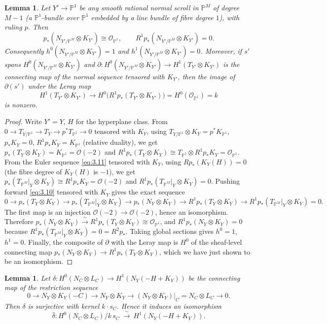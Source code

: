 \documentclass[11pt,twoside]{amsart}
\theoremstyle{plain}
\newtheorem{lemma}[theorem]{Lemma}
\theoremstyle{definition}
\newcommand{\PP}{\mathbb{P}}
\newcommand{\PM}{\mathbb{P}^M}
\newcommand{\OO}{\mathcal{O}}
\newcommand{\NY}{N_{Y}}
\newcommand{\TP}{T_{\PM}|_Y}
\begin{document}
\begin{lemma}\label{lem:pushforward}
Let $Y'\to\PP^1$ be any smooth rational normal scroll in $\PM$ of degree $M-1$ (a $\PP^1$-bundle over $\PP^1$ embedded by a line bundle of fibre degree $1$), with ruling $p$. Then
\[
p_*(N_{Y'/\PM}\otimes K_{Y'})\cong\OO_{\PP^1},\qquad R^1p_*(N_{Y'/\PM}\otimes K_{Y'})=0 .
\]
Consequently $h^0(N_{Y'/\PM}\otimes K_{Y'})=1$ and $h^1(N_{Y'/\PM}\otimes K_{Y'})=0$. Moreover, if $s'$ spans $H^0(N_{Y'/\PM}\otimes K_{Y'})$ and $\partial\colon H^0(N_{Y'/\PM}\otimes K_{Y'})\to H^1(T_{Y'}\otimes K_{Y'})$ is the connecting map of the normal sequence tensored with $K_{Y'}$, then the image of $\partial(s')$ under the Leray map
\[
H^1(T_{Y'}\otimes K_{Y'})\longrightarrow H^0\big(R^1p_*(T_{Y'}\otimes K_{Y'})\big)=H^0(\OO_{\PP^1})=k
\]
is nonzero.
\end{lemma}

\begin{proof}
Write $Y'=Y$, $H$ for the hyperplane class. From $0\to T_{Y/\PP^1}\to T_Y\to p^*T_{\PP^1}\to 0$ tensored with $K_Y$, using $T_{Y/\PP^1}\otimes K_Y=p^*K_{\PP^1}$, $p_*K_Y=0$, $R^1p_*K_Y=K_{\PP^1}$ (relative duality), we get $p_*(T_Y\otimes K_Y)=K_{\PP^1}=\OO(-2)$ and $R^1p_*(T_Y\otimes K_Y)\cong T_{\PP^1}\otimes R^1p_*K_Y=\OO_{\PP^1}$. From the Euler sequence \eqref{eq:3.11} tensored with $K_Y$, using $Rp_*(K_Y(H))=0$ (the fibre degree of $K_Y(H)$ is $-1$), we get $p_*(\TP\otimes K_Y)\cong R^1p_*K_Y=\OO(-2)$ and $R^1p_*(\TP\otimes K_Y)=0$. Pushing forward \eqref{eq:3.10} tensored with $K_Y$ gives the exact sequence
\[
0\to p_*(T_Y\otimes K_Y)\to p_*(\TP\otimes K_Y)\to p_*(\NY\otimes K_Y)\to R^1p_*(T_Y\otimes K_Y)\to R^1p_*(\TP\otimes K_Y)=0 .
\]
The first map is an injection $\OO(-2)\to\OO(-2)$, hence an isomorphism. Therefore $p_*(\NY\otimes K_Y)\xrightarrow{\ \sim\ }R^1p_*(T_Y\otimes K_Y)\cong\OO_{\PP^1}$, and $R^1p_*(\NY\otimes K_Y)=0$ because $R^1p_*(\TP\otimes K_Y)=0=R^2p_*$. Taking global sections gives $h^0=1$, $h^1=0$. Finally, the composite of $\partial$ with the Leray map is $H^0$ of the sheaf-level connecting map $p_*(\NY\otimes K_Y)\to R^1p_*(T_Y\otimes K_Y)$, which we have just shown to be an isomorphism.
\end{proof}

\begin{lemma}\label{lem:delta}
Let $\delta\colon H^0(N_C\otimes L_C)\to H^1(\NY(-H+K_Y))$ be the connecting map of the restriction sequence
\[
0\to \NY\otimes K_Y(-C)\to \NY\otimes K_Y\to (\NY\otimes K_Y)|_C=N_C\otimes L_C\to 0 .
\]
Then $\delta$ is surjective with kernel $k\cdot s_C$. Hence it induces an isomorphism
\[
\bar\delta\colon H^0(N_C\otimes L_C)/k\,s_C\ \xrightarrow{\ \sim\ }\ H^1(\NY(-H+K_Y)) .
\]
\end{lemma}
\end{document}
